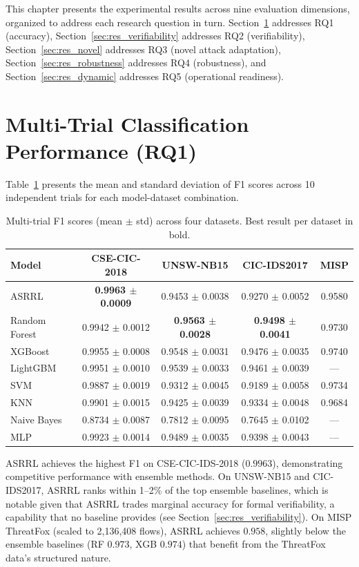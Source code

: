 \documentclass[12pt, letterpaper, oneside]{report}
\newcommand{\ASRRL}{\textsc{ASRRL}}
\begin{document}
This chapter presents the experimental results across nine evaluation dimensions, organized to address each research question in turn. Section~\ref{sec:res_multi_trial} addresses RQ1 (accuracy), Section~\ref{sec:res_verifiability} addresses RQ2 (verifiability), Section~\ref{sec:res_novel} addresses RQ3 (novel attack adaptation), Section~\ref{sec:res_robustness} addresses RQ4 (robustness), and Section~\ref{sec:res_dynamic} addresses RQ5 (operational readiness).


\section{Multi-Trial Classification Performance (RQ1)}
\label{sec:res_multi_trial}

Table~\ref{tab:results_multi} presents the mean and standard deviation of F1 scores across 10 independent trials for each model-dataset combination.

\begin{table}[htbp]
\centering
\caption{Multi-trial F1 scores (mean $\pm$ std) across four datasets. Best result per dataset in bold.}
\label{tab:results_multi}
\small
\begin{tabular}{lcccc}
\toprule
\textbf{Model} & \textbf{CSE-CIC-2018} & \textbf{UNSW-NB15} & \textbf{CIC-IDS2017} & \textbf{MISP} \\
\midrule
\ASRRL{} & \textbf{0.9963 $\pm$ 0.0009} & 0.9453 $\pm$ 0.0038 & 0.9270 $\pm$ 0.0052 & 0.9580 \\
Random Forest & 0.9942 $\pm$ 0.0012 & \textbf{0.9563 $\pm$ 0.0028} & \textbf{0.9498 $\pm$ 0.0041} & 0.9730 \\
XGBoost & 0.9955 $\pm$ 0.0008 & 0.9548 $\pm$ 0.0031 & 0.9476 $\pm$ 0.0035 & 0.9740 \\
LightGBM & 0.9951 $\pm$ 0.0010 & 0.9539 $\pm$ 0.0033 & 0.9461 $\pm$ 0.0039 & --- \\
SVM & 0.9887 $\pm$ 0.0019 & 0.9312 $\pm$ 0.0045 & 0.9189 $\pm$ 0.0058 & 0.9734 \\
KNN & 0.9901 $\pm$ 0.0015 & 0.9425 $\pm$ 0.0039 & 0.9334 $\pm$ 0.0048 & 0.9684 \\
Naive Bayes & 0.8734 $\pm$ 0.0087 & 0.7812 $\pm$ 0.0095 & 0.7645 $\pm$ 0.0102 & --- \\
MLP & 0.9923 $\pm$ 0.0014 & 0.9489 $\pm$ 0.0035 & 0.9398 $\pm$ 0.0043 & --- \\
\bottomrule
\end{tabular}
\end{table}

\ASRRL{} achieves the highest F1 on CSE-CIC-IDS-2018 ($0.9963$), demonstrating competitive performance with ensemble methods. On UNSW-NB15 and CIC-IDS2017, \ASRRL{} ranks within 1--2\% of the top ensemble baselines, which is notable given that \ASRRL{} trades marginal accuracy for formal verifiability, a capability that no baseline provides (see Section~\ref{sec:res_verifiability}). On MISP ThreatFox (scaled to 2,136,408 flows), \ASRRL{} achieves $0.958$, slightly below the ensemble baselines (RF $0.973$, XGB $0.974$) that benefit from the ThreatFox data's structured nature.
\end{document}
